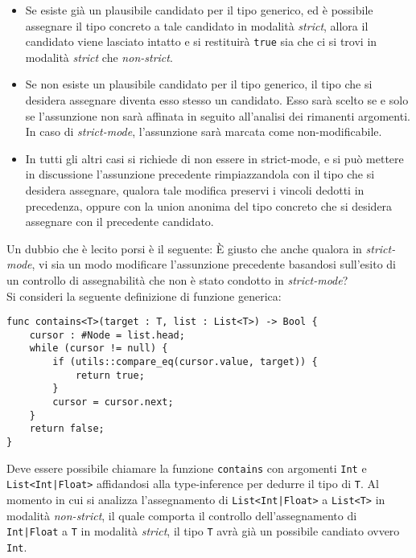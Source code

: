 \begin{itemize}
    \item Se esiste già un plausibile candidato per il tipo generico, ed è possibile 
    assegnare il tipo concreto a tale candidato in modalità \textit{strict}, allora il candidato viene 
    lasciato intatto e si restituirà \texttt{true} sia che ci si trovi in modalità 
    \textit{strict} che \textit{non-strict}.

    \item Se non esiste un plausibile candidato per il tipo generico, il tipo che si desidera 
    assegnare diventa esso stesso un candidato. Esso sarà scelto se e solo se l'assunzione non 
    sarà affinata in seguito all'analisi dei rimanenti argomenti. In caso di \textit{strict-mode},
    l'assunzione sarà marcata come non-modificabile.

    \item In tutti gli altri casi si richiede di non essere in strict-mode, e si può mettere 
    in discussione l'assunzione precedente rimpiazzandola con il tipo che si desidera assegnare, 
    qualora tale modifica preservi i vincoli dedotti in precedenza, oppure con la union anonima 
    del tipo concreto che si desidera assegnare con il precedente candidato.
\end{itemize}

Un dubbio che è lecito porsi è il seguente: È giusto che anche qualora in \textit{strict-mode}, vi sia 
un modo modificare l'assunzione precedente basandosi sull'esito di un controllo di assegnabilità che 
non è stato condotto in \textit{strict-mode}? \\

Si consideri la seguente definizione di funzione generica:

\vspace{0.5cm}
\begin{lstlisting}[frame=single]
func contains<T>(target : T, list : List<T>) -> Bool {
    cursor : #Node = list.head;
    while (cursor != null) {
        if (utils::compare_eq(cursor.value, target)) {
            return true;
        }
        cursor = cursor.next;
    }
    return false;
}
\end{lstlisting}
\vspace{0.5cm}

Deve essere possibile chiamare la funzione \texttt{contains} con argomenti \texttt{Int} e \texttt{List<Int|Float>}
affidandosi alla type-inference per dedurre il tipo di \texttt{T}. Al momento in cui si analizza l'assegnamento 
di \texttt{List<Int|Float>} a \texttt{List<T>} in modalità \textit{non-strict}, il quale comporta il controllo 
dell'assegnamento di \texttt{Int|Float} a \texttt{T} in modalità \textit{strict}, il tipo \texttt{T} avrà
già un possibile candiato ovvero \texttt{Int}. \\

